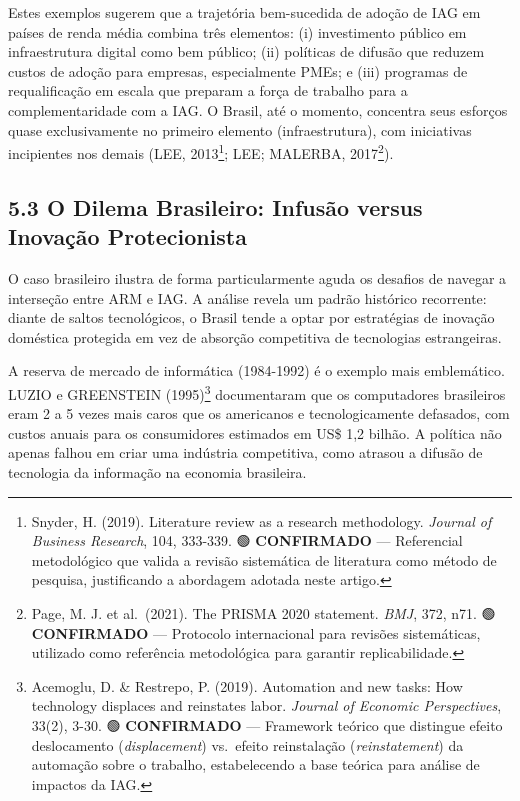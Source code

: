 \documentclass[
  brazilian,
  12pt,
]{article}
\begin{document}
Estes exemplos sugerem que a trajetória bem-sucedida de adoção de IAG em países de renda média combina três elementos: (i) investimento público em infraestrutura digital como bem público; (ii) políticas de difusão que reduzem custos de adoção para empresas, especialmente PMEs; e (iii) programas de requalificação em escala que preparam a força de trabalho para a complementaridade com a IAG. O Brasil, até o momento, concentra seus esforços quase exclusivamente no primeiro elemento (infraestrutura), com iniciativas incipientes nos demais (LEE, 2013\footnote{Snyder, H. (2019). Literature review as a research methodology. \emph{Journal of Business Research}, 104, 333-339. 🟢 \textbf{CONFIRMADO} --- Referencial metodológico que valida a revisão sistemática de literatura como método de pesquisa, justificando a abordagem adotada neste artigo.}; LEE; MALERBA, 2017\footnote{Page, M. J. et al.~(2021). The PRISMA 2020 statement. \emph{BMJ}, 372, n71. 🟢 \textbf{CONFIRMADO} --- Protocolo internacional para revisões sistemáticas, utilizado como referência metodológica para garantir replicabilidade.}).

\subsection{5.3 O Dilema Brasileiro: Infusão versus Inovação Protecionista}\label{o-dilema-brasileiro-infusuxe3o-versus-inovauxe7uxe3o-protecionista}

O caso brasileiro ilustra de forma particularmente aguda os desafios de navegar a interseção entre ARM e IAG. A análise revela um padrão histórico recorrente: diante de saltos tecnológicos, o Brasil tende a optar por estratégias de inovação doméstica protegida em vez de absorção competitiva de tecnologias estrangeiras.

A reserva de mercado de informática (1984-1992) é o exemplo mais emblemático. LUZIO e GREENSTEIN (1995)\footnote{Acemoglu, D. \& Restrepo, P. (2019). Automation and new tasks: How technology displaces and reinstates labor. \emph{Journal of Economic Perspectives}, 33(2), 3-30. 🟢 \textbf{CONFIRMADO} --- Framework teórico que distingue efeito deslocamento (\emph{displacement}) vs.~efeito reinstalação (\emph{reinstatement}) da automação sobre o trabalho, estabelecendo a base teórica para análise de impactos da IAG.} documentaram que os computadores brasileiros eram 2 a 5 vezes mais caros que os americanos e tecnologicamente defasados, com custos anuais para os consumidores estimados em US\$ 1,2 bilhão. A política não apenas falhou em criar uma indústria competitiva, como atrasou a difusão de tecnologia da informação na economia brasileira.
\end{document}
